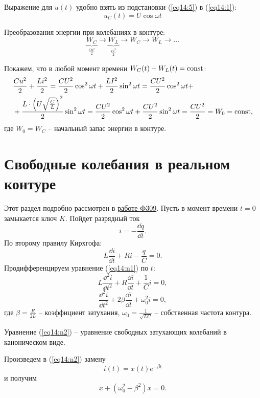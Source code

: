 	Выражение для \( u(t) \) удобно взять из подстановки (\ref{eq14:5}) в
    (\ref{eq14:1}):
	\begin{equation}
		u_C(t) = U\cos\omega t
	\end{equation}
	
	Преобразования энергии при колебаниях в контуре:
	\[
        \underbrace{W_C}_{\frac{Cu^2}{2}} \to \underbrace{W_L}_{\frac{Li^2}{2}}
        \to W_C \to W_L \to \ldots
    \]
	
	Покажем, что в любой момент времени \( W_C(t) + W_L(t) = \mathrm{const} \):
	\begin{align*}
        & \frac{Cu^2}{2} + \frac{Li^2}{2} = \frac{CU^2}{2}\cos^2\omega t +
        \frac{LI^2}{2}\sin^2\omega t = \frac{CU^2}{2}\cos^2\omega t + \\
        & + \frac{L\cdot\left(U\sqrt{\frac{C}{L}}\right)^2}{2}\sin^2\omega t =
        \frac{CU^2}{2}\cos^2\omega t + \frac{CU^2}{2}\sin^2\omega t =
        \frac{CU^2}{2} = W_0 = \mathrm{const},
	\end{align*}
	где \( W_0 = W_C \) -- начальный запас энергии в контуре.
	
\section{Свободные колебания в реальном контуре}

	Этот раздел подробно рассмотрен в \href{http://dl.dropbox.com/u/41185505/University/Physics/Electricity/%D0%A4309.pdf}{работе Ф309}. Пусть в момент времени \(  t = 0 \)
    замыкается ключ \( K \). Пойдет разрядный ток
    \[
        i = -\frac{\dd q}{\dd t}.
    \]
	По второму правилу Кирхгофа:
	\begin{equation}
		L\frac{\dd i}{\dd t} + Ri - \frac{q}{C} = 0.
        \label{eq14:n1}
	\end{equation}
	Продифференцируем уравнение (\ref{eq14:n1}) по \( t \):
	\[
        L\frac{\dd^2 i}{\dd t^2} + R\frac{\dd i}{\dd t} + \frac{1}{C}i = 0,
    \]
	\begin{equation}
		\frac{\dd^2 i}{\dd t^2} + 2\beta\frac{\dd i}{\dd t} + \omega_0^2 i = 0,
        \label{eq14:n2}
	\end{equation}
	где \( \beta = \frac{R}{2L} \) -- коэффициент затухания,
    \( \omega_0 = \frac{1}{\sqrt{LC}} \) -- собственная частота контура.
	
	Уравнение (\ref{eq14:n2}) -- уравнение свободных затухающих колебаний в
    каноническом виде.
	
	Произведем в (\ref{eq14:n2}) замену
	\begin{equation}
		i(t) = x(t)e^{-\beta t}
        \label{eq14:n3}
	\end{equation}
	и получим
	\begin{equation}
		\ddot{x} + (\omega_0^2 - \beta^2)x = 0.
        \label{eq14:n4}
	\end{equation}
	
